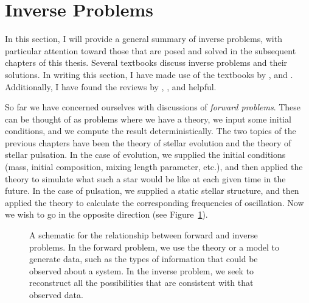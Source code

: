 \section{Inverse Problems} 
\label{sec:inverse}
\begin{shaded}
\noindent In this section, I will provide a general summary of inverse problems, with particular attention toward those that are posed and solved in the subsequent chapters of this thesis. 
Several textbooks discuss inverse problems and their solutions. 
In writing this section, I have made use of the textbooks by \citet{basuchaplin2017}, \citet{kirsch2011introduction} and \citet{neto2012introduction}. 
Additionally, I have found the reviews by \citet{tenorio2001statistical}, \citet{GoughThompson1991}, and \citet{2018ASSP...49...75R} helpful. 
\end{shaded}

So far we have concerned ourselves with discussions of \emph{forward problems}. 
These can be thought of as problems where we have a theory, we input some initial conditions, and we compute the result deterministically. 
The two topics of the previous chapters have been the theory of stellar evolution and the theory of stellar pulsation. 
In the case of evolution, we supplied the initial conditions (mass, initial composition, mixing length parameter, etc.), and then applied the theory to simulate what such a star would be like at each given time in the future. 
In the case of pulsation, we supplied a static stellar structure, and then applied the theory to calculate the corresponding frequencies of oscillation. 
Now we wish to go in the opposite direction (see Figure~\ref{fig:forward-inverse}). 

\begin{figure}
    \centering
{}
     \caption[Forward and Inverse Problems]{A schematic for the relationship between forward and inverse problems. 
            In the forward problem, we use the theory or a model to generate data, such as the types of information that could be observed about a system. 
            In the inverse problem, we seek to reconstruct all the possibilities that are consistent with that observed data. 
        \label{fig:forward-inverse}}
\end{figure}

